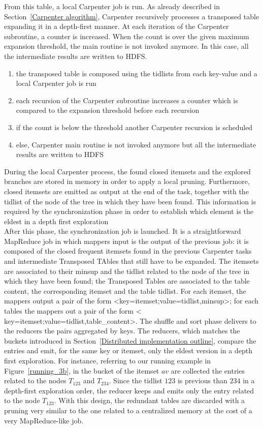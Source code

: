  From this table, a local Carpenter job is run. As already described in Section~\ref{Carpenter algorithm}, Carpenter recursively processes a transposed table expanding it in a depth-first manner. At each iteration of the Carpenter subroutine, a counter is increased. When the count is over the given maximum expansion threshold, the main routine is not invoked anymore. In this case, all the intermediate results are written to HDFS.
 \begin{enumerate}
 \item the transposed table is composed using the tidlists from each key-value
 and a local Carpenter job is run
 \item each recursion of the Carpenter subroutine increases a counter which is
 compared to the expansion threshold before each recursion
\item if the count is below the threshold another Carpenter recursion is scheduled
\item else, Carpenter main routine is not invoked anymore but all the
 intermediate results are written to HDFS
\end{enumerate}
During the local Carpenter process, the found closed itemsets and the explored branches are
 stored in memory in order to apply a local pruning. Furthermore, closed itemsets are emitted as output at the end of the task, together with the tidlist of the node of the tree in
which they have been found. This information is required by the synchronization phase in order to establish which element is the eldest in a depth first
exploration\\
After this phase, the synchronization job is launched. It is a straightforward
MapReduce job in which mappers input is the output of the previous job: it is
 composed of the closed frequent itemsets found in the previous Carpenter tasks
 and intermediate Transposed TAbles that still have to be expanded. The itemsets
 are associated to their minsup and the tidlist related to the node of the tree
 in which they have been found; the Transposed Tables are associated to the table content,
 the corresponding itemset and the table tidlist. For each itemset, the mappers
 output a pair of the form \textless key=itemset;value=tidlist,minsup\textgreater; for
 each tables the mappers out a pair of the form \textless
 key=itemset;value=tidlist,table\_content\textgreater. The shuffle and sort phase
 delivers to the reducers the pairs aggregated by keys. The reducers, which matches the buckets introduced in Section~\ref{Distributed implementation outline}, compare the
 entries and emit, for the same key or itemset, only the eldest version in a
 depth first exploration. For instance, referring to our running example in Figure~\ref{running_3b}, in the bucket of the itemset $av$ are collected the entries related to the nodes $T_{1 2 3}$ and $T_{2 3 4}$. Since the tidlist $1 2 3$ is previous than $2 3 4$ in a depth-first exploration order, the reducer keeps and emits only the entry related to the node $T_{1 2 3}$.
 With this design, the redundant tables are discarded with a pruning very similar to the one
 related to a centralized memory at the cost of a very MapReduce-like job.

